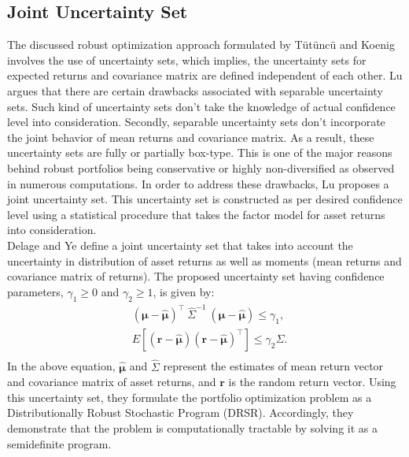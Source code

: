 \documentclass[a4paper,12pt,twoside]{article}
\begin{document}
\subsection{Joint Uncertainty Set}
The discussed robust optimization approach formulated by Tütüncü and Koenig involves the use of  uncertainty sets, which implies, the uncertainty sets for expected returns and covariance matrix are defined independent of each other. Lu \cite{lu} argues that there are certain drawbacks associated with separable uncertainty sets. Such kind of uncertainty sets don't take the knowledge of actual confidence level into consideration. Secondly, separable uncertainty sets don't incorporate the joint behavior of mean returns and covariance matrix. As a result, these uncertainty sets are fully or partially box-type. This is one of the major reasons behind robust portfolios being conservative or highly non-diversified as observed in numerous computations. In order to address these drawbacks, Lu proposes a joint uncertainty set. This uncertainty set is constructed as per desired confidence level using a statistical procedure that takes the factor model \cite{goldfarb2} for asset returns into consideration.\\

Delage and Ye \cite{delage} define a joint uncertainty set that takes into account the uncertainty in distribution of asset returns as well as moments (mean returns and covariance matrix of returns). The proposed uncertainty set having confidence parameters, $\gamma_{1} \geq 0$ and $\gamma_{2} \geq 1$, is given by:
\begin{equation}
\begin{split}
    & (\boldsymbol{\mu} - \boldsymbol{\hat{\mu}})^{\top} \ \hat{\Sigma}^{-1} \ (\boldsymbol{\mu} - \boldsymbol{\hat{\mu}}) \leq \gamma_{1}, \\
    & E[(\mathbf{r} - \boldsymbol{\hat{\mu}})(\mathbf{r} - \boldsymbol{\hat{\mu}})^{\top}] \leq \gamma_{2}\hat{\Sigma}. \\
\end{split}
\end{equation}
In the above equation, $\boldsymbol{\hat{\mu}}$ and $\hat{\Sigma}$ represent the estimates of mean return vector and covariance matrix of asset returns, and $\mathbf{r}$ is the random return vector. Using this uncertainty set, they formulate the portfolio optimization problem as a Distributionally Robust Stochastic Program (DRSR). Accordingly, they demonstrate that the problem is computationally tractable by solving it as a semidefinite program. 
\renewcommand\refname{Bibliography}

 

\end{document}
